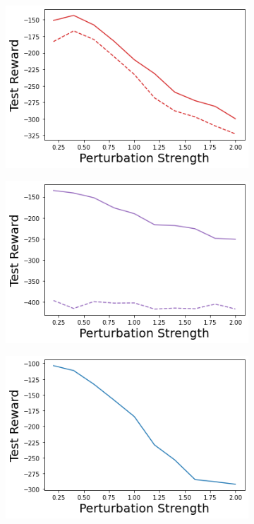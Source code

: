 \begin{figure}
    \begin{subfigure}{.24\textwidth}
        \includegraphics[width=\textwidth]{sections/011_icml2022/resources/state_shift-DropOut-AcrobotShift-v0-mean_reward_.png}
    \end{subfigure}
    \begin{subfigure}{.24\textwidth}
        \includegraphics[width=\textwidth]{sections/011_icml2022/resources/state_shift-Ensemble-AcrobotShift-v0-mean_reward_.png}
    \end{subfigure}
    \begin{subfigure}{.24\textwidth}
        \includegraphics[width=\textwidth]{sections/011_icml2022/resources/state_shift-DKL-AcrobotShift-v0-mean_reward_.png}

\end{subfigure}
\end{figure}
